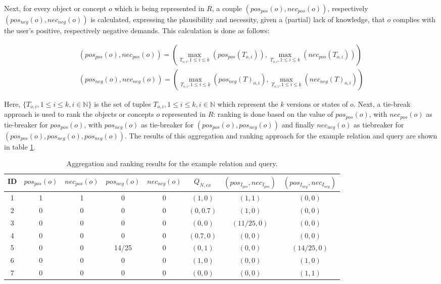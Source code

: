\documentclass[runningheads,a4paper]{llncs}
\begin{document}
Next, for every object or concept $o$ which is being represented in $R$, a couple $(pos_{pos}(o), nec_{pos}(o))$, respectively $(pos_{neg}(o), nec_{neg}(o))$ is calculated, expressing the plausibility and necessity, given a (partial) lack of knowledge, that $o$ complies with the user's positive, respectively negative demands. This calculation is done as follows:

\vspace{-10pt}
\begin{align}
(pos_{pos}(o), nec_{pos}(o)) = (\max_{T_{o,i}, 1 \leq i \leq k}(pos_{pos}(T_{o,i})), \max_{T_{o,i}, 1 \leq i \leq k}(nec_{pos}(T_{o,i}))) \nonumber \\
(pos_{neg}(o), nec_{neg}(o)) = (\max_{T_{o,i}, 1 \leq i \leq k}(pos_{neg}(T)_{o,i}), \max_{T_{o,i}, 1 \leq i \leq k}(nec_{neg}(T)_{o,i})) \nonumber
\end{align}

Here, $\{T_{o,i}, 1 \leq i \leq k, i \in \mathbb{N}\}$ is the set of tuples $T_{o,i}, 1 \leq i \leq k, i \in \mathbb{N}$ which represent the $k$ versions or states of $o$. Next, a tie-break approach is used to rank the objects or concepts $o$ represented in $R$: ranking is done based on the value of $pos_{pos}(o)$, with $nec_{pos}(o)$ as tie-breaker for $pos_{pos}(o)$, with $pos_{neg}(o)$ as tie-breaker for $( pos_{pos}(o), pos_{neg}(o))$ and finally $nec_{neg}(o)$ as tiebreaker for $(pos_{pos}(o), pos_{neg}(o), pos_{neg}(o))$. The results of this aggregation and ranking approach for the example relation and query are shown in table \ref{tab:ex-ranking}.

\begin{table}[ht]
\caption{Aggregation and ranking results for the example relation and query.}
\centering
\begin{tabular}{|c|c|c|c|c||c|c|c|}
\hline
\textbf{ID} & \textbf{$pos_{pos}(o)$} & \textbf{$nec_{pos}(o)$} & \textbf{$pos_{neg}(o)$} & \textbf{$nec_{neg}(o)$} & \textbf{$Q_{N,ex}$} & \textbf{$(pos_{I_{pos}}, nec_{I_{pos}})$} & \textbf{$(pos_{I_{neg}}, nec_{I_{neg}})$} \\
\hline
\hline
1 & 1 & 1 & 0 & 0 & $(1, 0)$ & $(1,1)$ & $(0,0)$ \\
2 & 0 & 0 & 0 & 0 & $(0, 0.7)$ & $(1,0)$ & $(0,0)$ \\
3 & 0 & 0 & 0 & 0 & $(0, 0)$ & $(11/25,0)$ & $(0,0)$ \\
4 & 0 & 0 & 0 & 0 & $(0.7, 0)$ & $(0,0)$ & $(0,0)$ \\
5 & 0 & 0 & 14/25 & 0 & $(0, 1)$ & $(0,0)$ & $(14/25,0)$ \\
6 & 0 & 0 & 0 & 0 & $(1, 0)$ & $(0,0)$ & $(1,0)$ \\
7 & 0 & 0 & 0 & 0 & $(0, 0)$ & $(0,0)$ & $(1,1)$ \\
\hline
\end{tabular}
\label{tab:ex-ranking}
\end{table}
\end{document}
